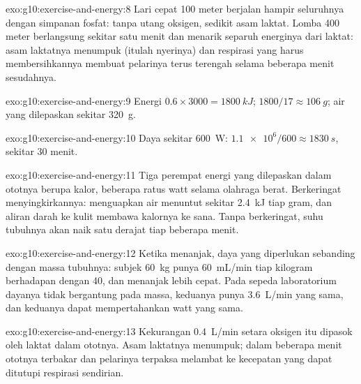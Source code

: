 \begin{solution}{exo:g10:exercise-and-energy:8}
Lari cepat 100 meter berjalan hampir seluruhnya dengan simpanan fosfat:
tanpa utang oksigen, sedikit asam laktat. Lomba 400 meter berlangsung
sekitar satu menit dan menarik separuh energinya dari 
laktat: asam laktatnya menumpuk (itulah nyerinya) dan respirasi yang
harus membersihkannya membuat pelarinya terus terengah selama beberapa
menit sesudahnya.
\end{solution}

\begin{solution}{exo:g10:exercise-and-energy:9}
Energi  $0.6 \times 3000 = \qty{1800}{kJ}$; 
$1800/17 \approx \qty{106}{g}$; air yang dilepaskan sekitar \qty{320}{g}.
\end{solution}

\begin{solution}{exo:g10:exercise-and-energy:10}
Daya  sekitar \qty{600}{W}: $\num{1.1e6}/600 \approx
\qty{1830}{s}$, sekitar 30 menit.
\end{solution}

\begin{solution}{exo:g10:exercise-and-energy:11}
Tiga perempat energi yang dilepaskan dalam ototnya berupa kalor,
beberapa ratus watt selama olahraga berat. Berkeringat
menyingkirkannya: menguapkan air menuntut sekitar \qty{2.4}{kJ} tiap
gram, dan aliran darah ke kulit membawa kalornya ke sana. Tanpa
berkeringat, suhu tubuhnya akan naik satu derajat tiap beberapa menit.
\end{solution}

\begin{solution}{exo:g10:exercise-and-energy:12}
Ketika menanjak, daya yang diperlukan sebanding dengan massa tubuhnya:
subjek \qty{60}{kg} punya \qty{60}{mL/min} tiap kilogram berhadapan
dengan \num{40}, dan menanjak lebih cepat. Pada sepeda laboratorium
dayanya tidak bergantung pada massa, keduanya punya \qty{3.6}{L/min}
yang sama, dan keduanya dapat mempertahankan watt yang sama.
\end{solution}

\begin{solution}{exo:g10:exercise-and-energy:13}
Kekurangan \qty{0.4}{L/min} setara oksigen itu dipasok oleh 
laktat dalam ototnya. Asam laktatnya menumpuk; dalam beberapa menit
ototnya terbakar dan pelarinya terpaksa melambat ke kecepatan yang
dapat ditutupi respirasi sendirian.
\end{solution}

